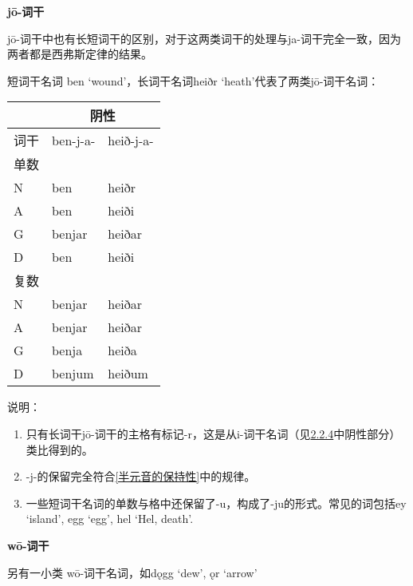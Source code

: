 \textbf{jō-词干}

jō-词干中也有长短词干的区别，对于这两类词干的处理与ja-词干完全一致，因为两者都是西弗斯定律的结果。

短词干名词 ben `wound'，长词干名词heiðr `heath'代表了两类jō-词干名词：

\begin{longtable}{lll}
  \toprule
     & \multicolumn{2}{c}{阴性}             \\
  \midrule
  \endhead
  \bottomrule
  \endfoot
  词干 & ben-j-a-               & heið-j-a- \\
  单数 &                        &           \\
  N  & ben                    & heiðr     \\
  A  & ben                    & heiði     \\
  G  & benjar                 & heiðar    \\
  D  & ben                    & heiði     \\
  复数 &                        &           \\
  N  & benjar                 & heiðar    \\
  A  & benjar                 & heiðar    \\
  G  & benja                  & heiða     \\
  D  & benjum                 & heiðum    \\
\end{longtable}

说明：

\begin{enumerate}
  \def\labelenumi{\arabic{enumi})}
  \item
        只有长词干jō-词干的主格有标记-r，这是从i-词干名词（见\hyperref[_Ref115770706]{2.2.4}中阴性部分）类比得到的。
  \item
        -j-的保留完全符合\ref{半元音的保持性}中的规律。
  \item
        一些短词干名词的单数与格中还保留了-u，构成了-ju的形式。常见的词包括ey
        `island', egg `egg', hel `Hel, death'.
\end{enumerate}

\textbf{wō-词干}

另有一小类 wō-词干名词，如dǫgg `dew', ǫr `arrow'

